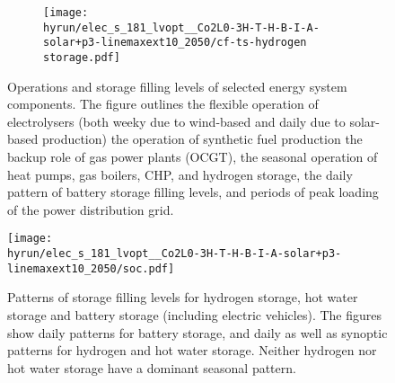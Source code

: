 \begin{figure}
\begin{subfigure}{0.49\textwidth}
    \end{subfigure}
    \begin{subfigure}{0.49\textwidth}
        \centering
        \texttt{[image: \\hyrun/elec\_s\_181\_lvopt\_\_Co2L0-3H-T-H-B-I-A-solar+p3-linemaxext10\_2050/cf-ts-hydrogen storage.pdf]}
    \end{subfigure}
    \caption{Operations and storage filling levels of selected energy system components. The figure outlines
    the flexible operation of electrolysers (both weeky due to wind-based and daily due to solar-based production)
    the operation of synthetic fuel production
    the backup role of gas power plants (OCGT),
    the seasonal operation of heat pumps, gas boilers, CHP, and hydrogen storage,
    the daily pattern of battery storage filling levels, and
    periods of peak loading of the power distribution grid.
    }
    \label{fig:si:utilisation-rate-ts}
\end{figure}


\begin{figure}
    \centering
    \texttt{[image: \\hyrun/elec\_s\_181\_lvopt\_\_Co2L0-3H-T-H-B-I-A-solar+p3-linemaxext10\_2050/soc.pdf]}
    \caption{Patterns of storage filling levels for hydrogen storage, hot water storage and battery storage (including electric vehicles). The figures show daily patterns for battery storage, and daily as well as synoptic patterns for hydrogen and hot water storage. Neither hydrogen nor hot water storage have a dominant seasonal pattern.}
    \label{fig:si:soc}
\end{figure}

